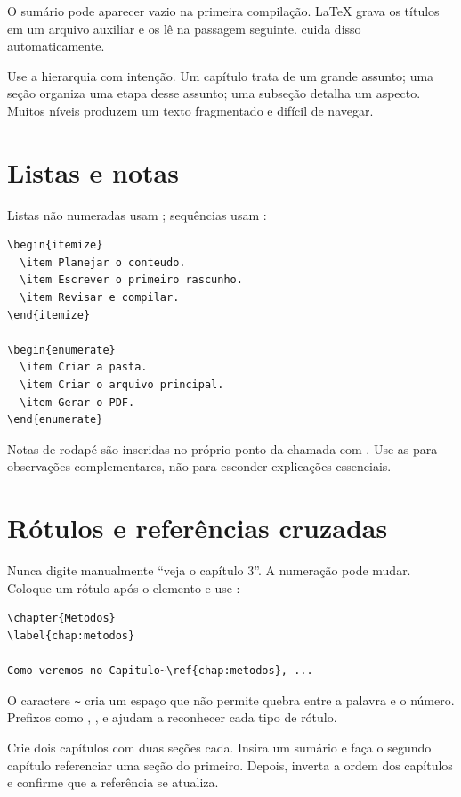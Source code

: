 O sumário pode aparecer vazio na primeira compilação. LaTeX grava os títulos em
um arquivo auxiliar e os lê na passagem seguinte.  cuida disso
automaticamente.

Use a hierarquia com intenção. Um capítulo trata de um grande assunto; uma seção
organiza uma etapa desse assunto; uma subseção detalha um aspecto. Muitos níveis
produzem um texto fragmentado e difícil de navegar.

\section{Listas e notas}

Listas não numeradas usam ; sequências usam
:

\begin{lstlisting}[language=LaTeXBook]
\begin{itemize}
  \item Planejar o conteudo.
  \item Escrever o primeiro rascunho.
  \item Revisar e compilar.
\end{itemize}

\begin{enumerate}
  \item Criar a pasta.
  \item Criar o arquivo principal.
  \item Gerar o PDF.
\end{enumerate}
\end{lstlisting}

Notas de rodapé são inseridas no próprio ponto da chamada com
. Use-as para observações complementares,
não para esconder explicações essenciais.

\section{Rótulos e referências cruzadas}

Nunca digite manualmente ``veja o capítulo 3''. A numeração pode mudar. Coloque
um rótulo após o elemento e use :

\begin{lstlisting}[language=LaTeXBook]
\chapter{Metodos}
\label{chap:metodos}

Como veremos no Capitulo~\ref{chap:metodos}, ...
\end{lstlisting}

O caractere \verb|~| cria um espaço que não permite quebra entre a palavra e o
número. Prefixos como , ,  e
 ajudam a reconhecer cada tipo de rótulo.

\begin{pratica}
  Crie dois capítulos com duas seções cada. Insira um sumário e faça o segundo
  capítulo referenciar uma seção do primeiro. Depois, inverta a ordem dos
  capítulos e confirme que a referência se atualiza.
\end{pratica}

